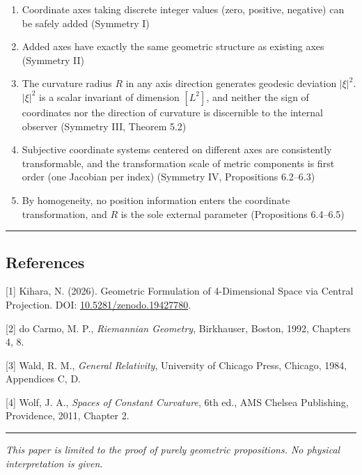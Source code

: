 \documentclass[a4paper,11pt]{article}
\theoremstyle{definition}
\providecommand{\tightlist}{\setlength{\itemsep}{0pt}\setlength{\parskip}{0pt}}
\begin{document}
\begin{enumerate}
\def\labelenumi{\arabic{enumi}.}
\tightlist
\item
  Coordinate axes taking discrete integer values (zero, positive, negative) can be safely added (Symmetry I)
\item
  Added axes have exactly the same geometric structure as existing axes (Symmetry II)
\item
  The curvature radius \(R\) in any axis direction generates geodesic deviation \(|\xi|^2\). \(|\xi|^2\) is a scalar invariant of dimension \([L^2]\), and neither the sign of coordinates nor the direction of curvature is discernible to the internal observer (Symmetry III, Theorem 5.2)
\item
  Subjective coordinate systems centered on different axes are consistently transformable, and the transformation scale of metric components is first order (one Jacobian per index) (Symmetry IV, Propositions 6.2--6.3)
\item
  By homogeneity, no position information enters the coordinate transformation, and \(R\) is the sole external parameter (Propositions 6.4--6.5)
\end{enumerate}

\begin{center}\rule{0.5\linewidth}{0.5pt}\end{center}

\subsection{References}\label{references}

{[}1{]} Kihara, N. (2026). Geometric Formulation of 4-Dimensional Space via Central Projection. DOI: \href{https://doi.org/10.5281/zenodo.19427780}{10.5281/zenodo.19427780}.

{[}2{]} do Carmo, M. P., \emph{Riemannian Geometry}, Birkhauser, Boston, 1992, Chapters 4, 8.

{[}3{]} Wald, R. M., \emph{General Relativity}, University of Chicago Press, Chicago, 1984, Appendices C, D.

{[}4{]} Wolf, J. A., \emph{Spaces of Constant Curvature}, 6th ed., AMS Chelsea Publishing, Providence, 2011, Chapter 2.

\begin{center}\rule{0.5\linewidth}{0.5pt}\end{center}

\emph{This paper is limited to the proof of purely geometric propositions. No physical interpretation is given.}
\end{document}
